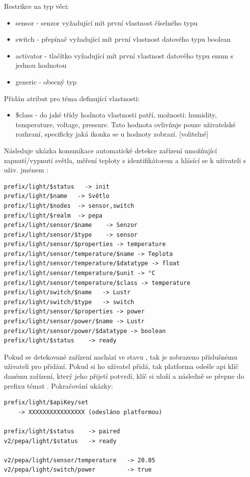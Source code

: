 Restrikce na typ věci:
\begin{itemize}
    \item sensor - senzor vyžadující mít první vlastnost číselného typu
    \item switch - přepínač vyžadující mít první vlastnost datového typu boolean
    \item activator - tlačítko vyžadující mít první vlastnost datového typu enum s jednou hodnotou
    \item generic - obecný typ
\end{itemize}

Přidán atribut pro téma definující vlastnosti:
\begin{itemize}
    \item \$class - do jaké třídy hodnota vlastnosti patří, možnosti: humidity, temperature, voltage, pressure. Tato hodnota ovlivňuje pouze uživatelské rozhraní, specificky jaká ikonka se u hodnoty zobrazí. [volitelné]
\end{itemize}


Následuje ukázka komunikace automatické detekce zařízení umožňující zapnutí/vypnutí světla, měření teploty s identifikátorem  a hlásící se k uživateli s uživ. jménem :
\begin{verbatim}
prefix/light/$status   -> init
prefix/light/$name   -> Světlo
prefix/light/$nodes  -> sensor,switch
prefix/light/$realm  -> pepa
prefix/light/sensor/$name    -> Senzor
prefix/light/sensor/$type    -> sensor
prefix/light/sensor/$properties -> temperature
prefix/light/sensor/temperature/$name -> Teplota
prefix/light/sensor/temperature/$datatype -> float
prefix/light/sensor/temperature/$unit -> °C
prefix/light/sensor/temperature/$class -> temperature
prefix/light/switch/$name   -> Lustr
prefix/light/switch/$type   -> switch
prefix/light/sensor/$properties -> power
prefix/light/sensor/power/$name -> Lustr
prefix/light/sensor/power/$datatype -> boolean
prefix/light/$status    -> ready
\end{verbatim}

Pokud se detekované zařízení nachází ve stavu , tak je zobrazeno příslušnému uživateli pro přidání. Pokud si ho uživatel přidá, tak platforma odešle api klíč danému zařízení, který jeho přijetí potvrdí, klíč si uloží a následně se přepne do prefixu témat . Pokračování ukázky:

\begin{verbatim}
prefix/light/$apiKey/set
    -> XXXXXXXXXXXXXXXX (odesláno platformou)

prefix/light/$status    -> paired
v2/pepa/light/$status   -> ready

v2/pepa/light/sensor/temperature   -> 20.05
v2/pepa/light/switch/power         -> true
\end{verbatim}

